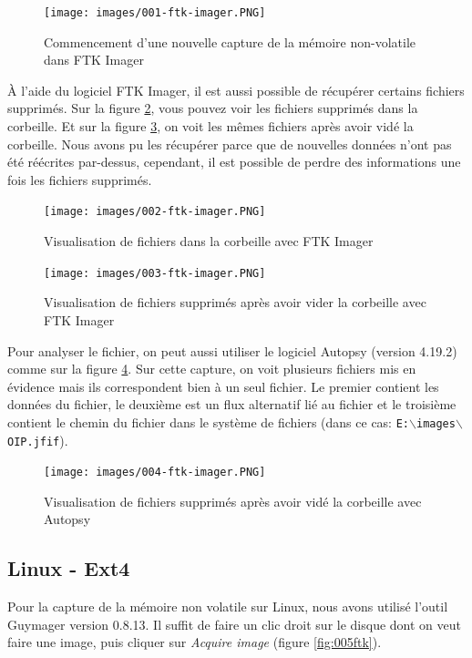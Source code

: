 \documentclass[a4paper]{article}
\begin{document}
\begin{figure}[H]
    \centering
    \texttt{[image: images/001-ftk-imager.PNG]}
    \caption{Commencement d'une nouvelle capture de la mémoire non-volatile dans FTK Imager}
    \label{fig:001ftk}
\end{figure}

À l'aide du logiciel FTK Imager, il est aussi possible de récupérer certains fichiers supprimés. Sur la figure \ref{fig:002ftk}, vous pouvez voir les fichiers supprimés dans la corbeille. Et sur la figure \ref{fig:003ftk}, on voit les mêmes fichiers après avoir vidé la corbeille. Nous avons pu les récupérer parce que de nouvelles données n'ont pas été réécrites par-dessus, cependant, il est possible de perdre des informations une fois les fichiers supprimés.

\begin{figure}[H]
    \centering
    \texttt{[image: images/002-ftk-imager.PNG]}
    \caption{Visualisation de fichiers dans la corbeille avec FTK Imager}
    \label{fig:002ftk}
\end{figure}
\begin{figure}[H]
    \centering
    \texttt{[image: images/003-ftk-imager.PNG]}
    \caption{Visualisation de fichiers supprimés après avoir vider la corbeille avec FTK Imager}
    \label{fig:003ftk}
\end{figure}

Pour analyser le fichier, on peut aussi utiliser le logiciel Autopsy (version 4.19.2) comme sur la figure \ref{fig:004ftk}. Sur cette capture, on voit plusieurs fichiers mis en évidence mais ils correspondent bien à un seul fichier. Le premier contient les données du fichier, le deuxième est un flux alternatif lié au fichier \cite{5} et le troisième contient le chemin du fichier dans le système de fichiers (dans ce cas: {\small \texttt{E:$\backslash$images$\backslash$OIP.jfif}}).

\begin{figure}[H]
    \centering
    \texttt{[image: images/004-ftk-imager.PNG]}
    \caption{Visualisation de fichiers supprimés après avoir vidé la corbeille avec Autopsy}
    \label{fig:004ftk}
\end{figure}



\subsection{Linux - Ext4} \label{sec:CaptureLinux}

Pour la capture de la mémoire non volatile sur Linux, nous avons utilisé l'outil Guymager version 0.8.13. Il suffit de faire un clic droit sur le disque dont on veut faire une image, puis cliquer sur \textit{Acquire image} (figure \ref{fig:005ftk}).
\end{document}
